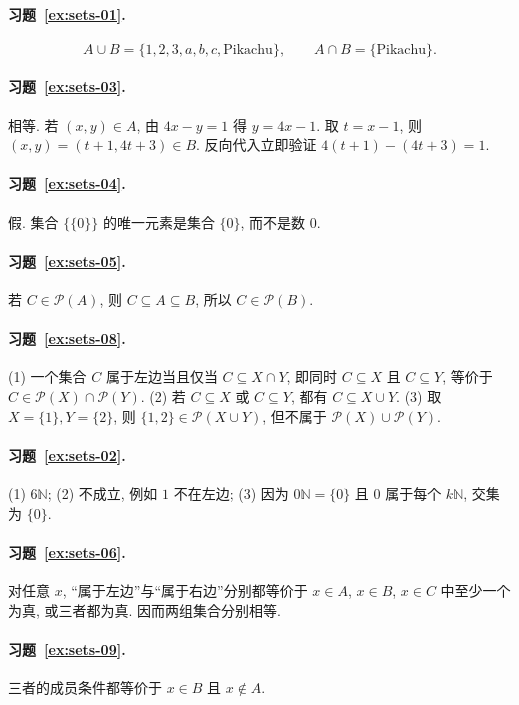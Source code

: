 \documentclass[usesamecnt, thmcnt=section, lang=cn, newtx, 10pt, scheme=chinese]{elegantbook}
\begin{document}
\paragraph*{习题~\ref{ex:sets-01}.}
\[
 A\cup B=\{1,2,3,a,b,c,\text{Pikachu}\},\qquad
 A\cap B=\{\text{Pikachu}\}.
\]

\paragraph*{习题~\ref{ex:sets-03}.}
相等. 若 $(x,y)\in A$, 由 $4x-y=1$ 得 $y=4x-1$. 取 $t=x-1$, 则 $(x,y)=(t+1,4t+3)\in B$. 反向代入立即验证 $4(t+1)-(4t+3)=1$.

\paragraph*{习题~\ref{ex:sets-04}.}
假. 集合 $\{\{0\}\}$ 的唯一元素是集合 $\{0\}$, 而不是数 $0$.

\paragraph*{习题~\ref{ex:sets-05}.}
若 $C\in\mathscr P(A)$, 则 $C\subseteq A\subseteq B$, 所以 $C\in\mathscr P(B)$.

\paragraph*{习题~\ref{ex:sets-08}.}
(1) 一个集合 $C$ 属于左边当且仅当 $C\subseteq X\cap Y$, 即同时 $C\subseteq X$ 且 $C\subseteq Y$, 等价于 $C\in\mathscr P(X)\cap\mathscr P(Y)$. (2) 若 $C\subseteq X$ 或 $C\subseteq Y$, 都有 $C\subseteq X\cup Y$. (3) 取 $X=\{1\},Y=\{2\}$, 则 $\{1,2\}\in\mathscr P(X\cup Y)$, 但不属于 $\mathscr P(X)\cup\mathscr P(Y)$.

\paragraph*{习题~\ref{ex:sets-02}.}
(1) $6\mathbb N$; (2) 不成立, 例如 $1$ 不在左边; (3) 因为 $0\mathbb N=\{0\}$ 且 $0$ 属于每个 $k\mathbb N$, 交集为 $\{0\}$.

\paragraph*{习题~\ref{ex:sets-06}.}
对任意 $x$, ``属于左边''与``属于右边''分别都等价于 $x\in A$, $x\in B$, $x\in C$ 中至少一个为真, 或三者都为真. 因而两组集合分别相等.

\paragraph*{习题~\ref{ex:sets-09}.}
三者的成员条件都等价于 $x\in B$ 且 $x\notin A$.
\end{document}
